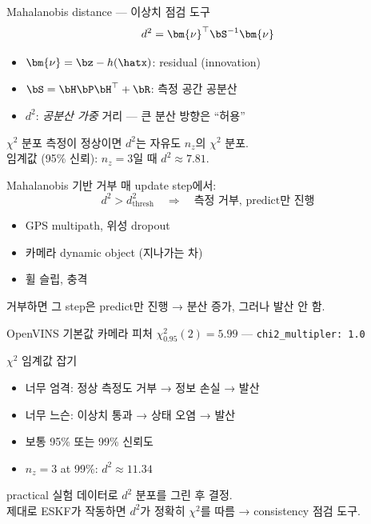 \begin{frame}{Mahalanobis distance — 이상치 점검 도구}
  \[
    d^2 = \bm{\nu}^\top \bS^{-1} \bm{\nu}
  \]
  \begin{itemize}
    \item $\bm{\nu} = \bz - h(\hatx)$: residual (innovation)
    \item $\bS = \bH \bP \bH^\top + \bR$: 측정 공간 공분산
    \item $d^2$: \emph{공분산 가중} 거리 — 큰 분산 방향은 ``허용''
  \end{itemize}
  \pause
  \vspace{0.3em}
  \begin{block}{$\chi^2$ 분포}
    측정이 정상이면 $d^2$는 자유도 $n_z$의 $\chi^2$ 분포. \\
    임계값 (95\% 신뢰): $n_z=3$일 때 $d^2 \approx 7.81$.
  \end{block}
\end{frame}

\begin{frame}{Mahalanobis 기반 거부}
  매 update step에서:
  \[
    d^2 > d^2_{\text{thresh}} \quad \Rightarrow \quad \text{측정 거부, predict만 진행}
  \]
  \begin{itemize}
    \item GPS multipath, 위성 dropout
    \item 카메라 dynamic object (지나가는 차)
    \item 휠 슬립, 충격
  \end{itemize}
  \pause
  \vspace{0.3em}
  거부하면 그 step은 predict만 진행 → 분산 증가, 그러나 발산 안 함.
  \vspace{0.2em}
  \begin{block}{OpenVINS 기본값}
    카메라 피처 $\chi^2_{0.95}(2) = 5.99$ — \texttt{chi2\_multipler: 1.0}
  \end{block}
\end{frame}

\begin{frame}{$\chi^2$ 임계값 잡기}
  \begin{itemize}
    \item 너무 엄격: 정상 측정도 거부 → 정보 손실 → 발산
    \item 너무 느슨: 이상치 통과 → 상태 오염 → 발산
    \item 보통 95\% 또는 99\% 신뢰도
    \item $n_z=3$ at 99\%: $d^2 \approx 11.34$
  \end{itemize}
  \pause
  \vspace{0.3em}
  \begin{block}{practical}
    실험 데이터로 $d^2$ 분포를 그린 후 결정. \\
    제대로 ESKF가 작동하면 $d^2$가 정확히 $\chi^2$를 따름 → consistency 점검 도구.
  \end{block}
\end{frame}


